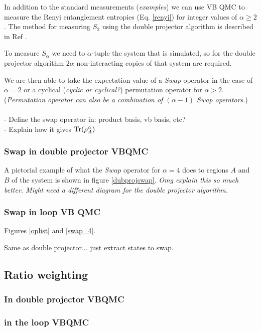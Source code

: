 \documentclass[prb,aps,twocolumn,floatfix,amsmath,amssymb,superscriptaddress,tightenlines]{revtex4}
\begin{document}
In addition to the standard measurements ({\it examples}) we can use VB QMC to measure the Renyi entanglement entropies (Eq. \eqref{renyi}) for integer values of $\alpha \ge 2$.  
The method for measuring $S_2$ using the double projector algorithm is described in Ref \cite{our paper}.

To measure $S_{\alpha}$ we need to $\alpha$-tuple the system that is simulated,
so for the double projector algorithm $2\alpha$ non-interacting copies of that system are required.  

We are then able to take the expectation value of a $Swap$ operator in the case of $\alpha = 2$ or a cyclical ({\it cyclic or cyclical?}) permutation operator for $\alpha > 2$. 
({\it Permutation operator can also be a combination of $(\alpha - 1)$ Swap operators}.)
\\\\
- Define the swap operator in: product basis, vb basis, etc?\\
- Explain how it gives ${\rm Tr} (\rho_A^{\alpha})$

\subsubsection{Swap in double projector VBQMC}
A pictorial example of what the $Swap$ operator for $\alpha = 4$ does to regions $A$ and $B$ of the system is shown in figure \ref{dubprojswap}. {\it Omg explain this so much better.  Might need a different diagram for the double projector algorithm.}

\subsubsection{Swap in  loop VB QMC}
Figures \ref{oplist} and \ref{swap_4}.

Same as double projector... just extract states to swap.

\subsection{Ratio weighting}

\subsubsection{In double projector VBQMC}
\subsubsection{in the loop VBQMC}
\end{document}
